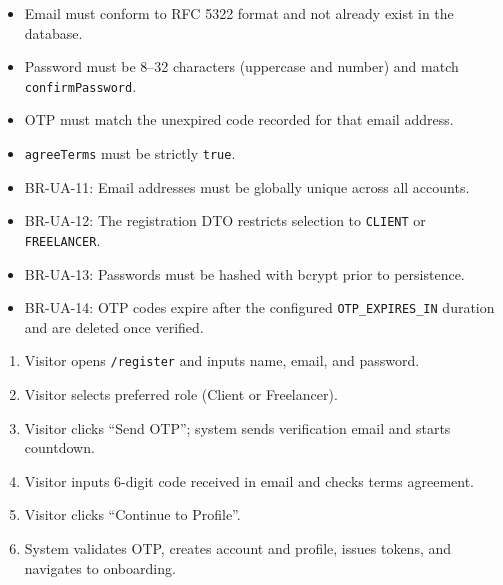\begin{itemize}[leftmargin=1.6em,topsep=3pt,itemsep=2pt,parsep=0pt,label=$\bullet$]
    \item Email must conform to RFC 5322 format and not already exist in the database.
    \item Password must be 8--32 characters (uppercase and number) and match \texttt{confirmPassword}.
    \item OTP must match the unexpired code recorded for that email address.
    \item \texttt{agreeTerms} must be strictly \texttt{true}.
\end{itemize}

\begin{itemize}[leftmargin=1.6em,topsep=3pt,itemsep=2pt,parsep=0pt,label=$\bullet$]\brrulelist
    \item BR-UA-11: Email addresses must be globally unique across all accounts.
    \item BR-UA-12: The registration DTO restricts selection to \texttt{CLIENT} or \texttt{FREELANCER}.
    \item BR-UA-13: Passwords must be hashed with bcrypt prior to persistence.
    \item BR-UA-14: OTP codes expire after the configured \texttt{OTP\_EXPIRES\_IN} duration and are deleted once verified.
\end{itemize}

\begin{enumerate}[leftmargin=1.8em,topsep=3pt,itemsep=2pt,parsep=0pt]
    \item Visitor opens \texttt{/register} and inputs name, email, and password.
    \item Visitor selects preferred role (Client or Freelancer).
    \item Visitor clicks ``Send OTP''; system sends verification email and starts countdown.
    \item Visitor inputs 6-digit code received in email and checks terms agreement.
    \item Visitor clicks ``Continue to Profile''.
    \item System validates OTP, creates account and profile, issues tokens, and navigates to onboarding.
\end{enumerate}

